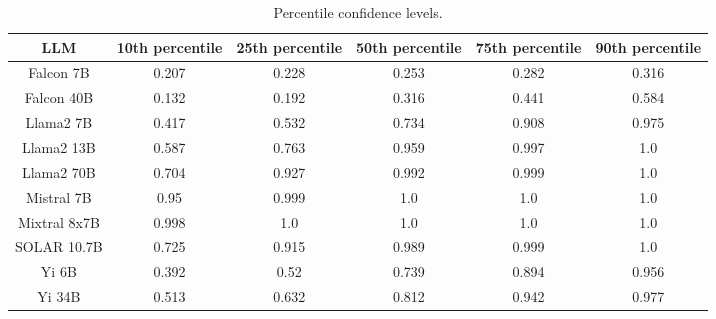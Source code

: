 \begin{table*}
\centering
\begin{tabular}{c|c|c|c|c|c}
LLM & 10th percentile & 25th percentile & 50th percentile & 75th percentile & 90th percentile\\ \hline
Falcon 7B & 0.207 & 0.228 & 0.253 & 0.282 & 0.316\\
Falcon 40B & 0.132 & 0.192 & 0.316 & 0.441 & 0.584\\
Llama2 7B & 0.417 & 0.532 & 0.734 & 0.908 & 0.975\\
Llama2 13B & 0.587 & 0.763 & 0.959 & 0.997 & 1.0\\
Llama2 70B & 0.704 & 0.927 & 0.992 & 0.999 & 1.0\\
Mistral 7B & 0.95 & 0.999 & 1.0 & 1.0 & 1.0\\
Mixtral 8x7B & 0.998 & 1.0 & 1.0 & 1.0 & 1.0\\
SOLAR 10.7B & 0.725 & 0.915 & 0.989 & 0.999 & 1.0\\
Yi 6B & 0.392 & 0.52 & 0.739 & 0.894 & 0.956\\
Yi 34B & 0.513 & 0.632 & 0.812 & 0.942 & 0.977\\
\hline
\end{tabular}
\caption{Percentile confidence levels.}
\label{tab:percentile_conf}
\end{table*}
